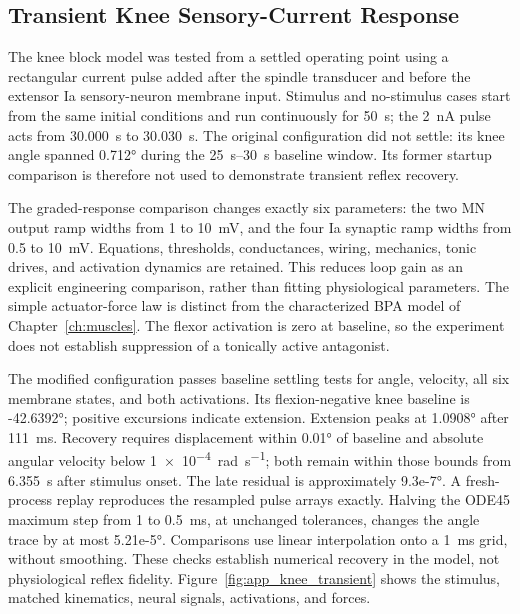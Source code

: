 \subsection{Transient Knee Sensory-Current Response}\label{sec:app_knee_transient}

The knee block model was tested from a settled operating point using a rectangular current pulse added after the spindle transducer and before the extensor Ia sensory-neuron membrane input. Stimulus and no-stimulus cases start from the same initial conditions and run continuously for \qty{50}{\second}; the \qty{2}{\nano\ampere} pulse acts from \qty{30.000}{\second} to \qty{30.030}{\second}. The original configuration did not settle: its knee angle spanned \ang{0.712} during the \qtyrange{25}{30}{\second} baseline window. Its former startup comparison is therefore not used to demonstrate transient reflex recovery.

The graded-response comparison changes exactly six parameters: the two MN output ramp widths from 1 to \qty{10}{\milli\volt}, and the four Ia synaptic ramp widths from 0.5 to \qty{10}{\milli\volt}. Equations, thresholds, conductances, wiring, mechanics, tonic drives, and activation dynamics are retained. This reduces loop gain as an explicit engineering comparison, rather than fitting physiological parameters. The simple actuator-force law is distinct from the characterized BPA model of Chapter~\ref{ch:muscles}. The flexor activation is zero at baseline, so the experiment does not establish suppression of a tonically active antagonist.

The modified configuration passes baseline settling tests for angle, velocity, all six membrane states, and both activations. Its flexion-negative knee baseline is \ang{-42.6392}; positive excursions indicate extension. Extension peaks at \ang{1.0908} after \qty{111}{\milli\second}. Recovery requires displacement within \ang{0.01} of baseline and absolute angular velocity below \qty{1e-4}{\radian\per\second}; both remain within those bounds from \qty{6.355}{\second} after stimulus onset. The late residual is approximately \ang{9.3e-7}. A fresh-process replay reproduces the resampled pulse arrays exactly. Halving the ODE45 maximum step from 1 to \qty{0.5}{\milli\second}, at unchanged tolerances, changes the angle trace by at most \ang{5.21e-5}. Comparisons use linear interpolation onto a \qty{1}{\milli\second} grid, without smoothing. These checks establish numerical recovery in the model, not physiological reflex fidelity. Figure~\ref{fig:app_knee_transient} shows the stimulus, matched kinematics, neural signals, activations, and forces.

